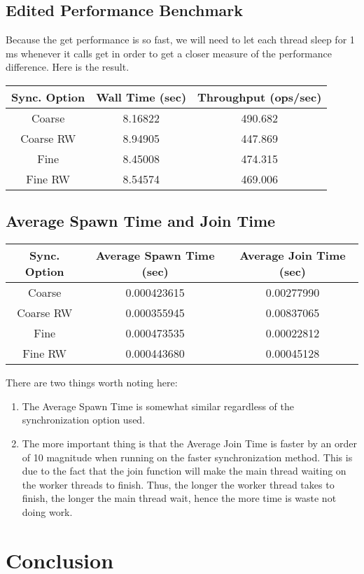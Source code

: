 \documentclass[11pt]{article}
\begin{document}
\subsection{Edited Performance Benchmark}
Because the get performance is so fast, we will need to let each thread sleep for 1 ms whenever it calls get in order to get a closer measure of the performance difference. Here is the result.
\begin{table}[H]
	\centering
	\begin{tabular}{|c|c|c|}
		\hline
		Sync. Option &Wall Time (sec)	&Throughput (ops/sec)	\\
		\hline
		Coarse &8.16822	&490.682\\
		\hline
		Coarse RW	&8.94905	&447.869\\
		\hline
		Fine	&8.45008	&474.315\\
		\hline
		Fine RW	&8.54574	&469.006\\
		\hline
	\end{tabular}
\end{table}
\subsection{Average Spawn Time and Join Time}
\begin{table}[H]
	\centering
	\begin{tabular}{|c|c|c|}
		\hline
		Sync. Option &Average Spawn Time (sec)	&Average Join Time (sec)	\\
		\hline
		Coarse &0.000423615	&0.00277990\\
		\hline
		Coarse RW	&0.000355945	&0.00837065\\
		\hline
		Fine	&0.000473535	&0.00022812\\
		\hline
		Fine RW	&0.000443680	&0.00045128\\
		\hline
	\end{tabular}
\end{table}
There are two things worth noting here:
\begin{enumerate}
	\item The Average Spawn Time is somewhat similar regardless of the synchronization option used.
	\item The more important thing is that the Average Join Time is faster by an order of 10 magnitude when running on the faster synchronization method. This is due to the fact that the join function will make the main thread waiting on the worker threads to finish. Thus, the longer the worker thread takes to finish, the longer the main thread wait, hence the more time is waste not doing work.
\end{enumerate}
\section{Conclusion}
\end{document}
